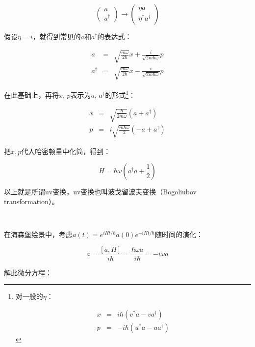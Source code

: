 \begin{equation*}
\left( \begin{array}{c} a \\ a^\dagger \end{array} \right) \rightarrow \left( \begin{array}{c} \eta a \\  \eta^* a^\dagger \end{array} \right)
\end{equation*}

假设$\eta = i$，就得到常见的$a$和$a^\dagger$的表达式：

\begin{eqnarray}
a & = & \sqrt{\frac{m \omega}{2\hbar}} x + \frac{i}{\sqrt{2m\hbar \omega}} p \\
a^\dagger & = & \sqrt{\frac{m \omega}{2\hbar}} x - \frac{i}{\sqrt{2m\hbar \omega}} p
\end{eqnarray}

在此基础上，再将$x$, $p$表示为$a$, $a^{\dagger}$的形式\footnote{ 对一般的$\eta$：

\begin{eqnarray}
x & = & i \hbar (v^* a - v a^\dagger) \\
p & = & - i \hbar ( u^* a -u a^\dagger )
\end{eqnarray}}：

\begin{eqnarray}
x &=& \sqrt{\frac{\hbar}{ 2 m \omega} } (a + a^\dagger) \\
p &=& i \sqrt{ \frac{m \hbar \omega}{2} } (-a + a^\dagger)
\end{eqnarray}

把$x, p$代入哈密顿量中化简，得到：

\begin{equation}
H = \hbar \omega(a^{\dagger}a +\frac{1}{2})
\end{equation}

以上就是所谓uv变换，uv变换也叫波戈留波夫变换（Bogoliubov transformation）。

~~

在海森堡绘景中，考虑$a(t) = e^{i Ht / \hbar} a(0) e^{- i Ht /\hbar}$随时间的演化：

\begin{equation}
\dot a = \frac{[a, H]}{i \hbar} = \frac{ \hbar \omega a }{i \hbar} = - i \omega a
\end{equation}

解此微分方程：

